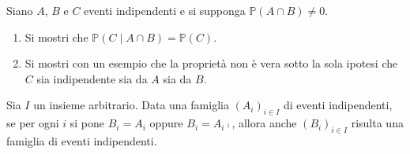 Siano $A$, $B$ e $C$ eventi indipendenti e si supponga $\mathbb{P}( A\cap B) \neq 0$.
\begin{enumerate}
\item Si mostri che $\mathbb{P}( C\mid A\cap B) =\mathbb{P}( C)$.
\item Si mostri con un esempio che la proprietà non è vera sotto la sola ipotesi che $C$ sia indipendente sia da $A$ sia da $B$.
\end{enumerate}
\Esercizio{}

Sia $I$ un insieme arbitrario. Data una famiglia $( A_{i})_{i\in I}$ di eventi indipendenti, se per ogni $i$ si pone $B_{i} =A_{i}$ oppure $B_{i} =A_{i}\comp$, allora anche $( B_{i})_{i\in I}$ risulta una famiglia di eventi indipendenti.


\ParteSoluzioni



\Soluzione

